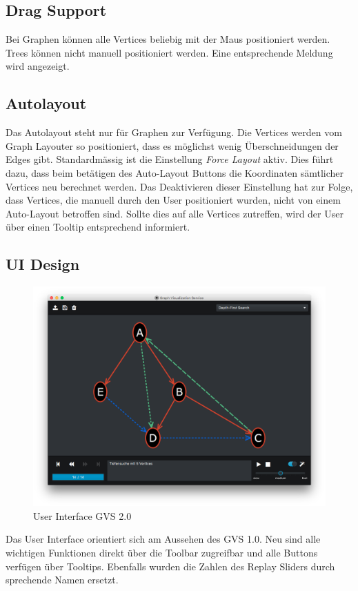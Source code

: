 \documentclass[11pt,a4paper,english,oneside]{book}
\numberwithin{equation}{chapter}
\begin{document}
	\subsection{Drag Support}
	Bei Graphen können alle Vertices beliebig mit der Maus positioniert werden. Trees können nicht manuell positioniert werden. Eine entsprechende Meldung wird angezeigt.
		
	\subsection{Autolayout}
	Das Autolayout steht nur für Graphen zur Verfügung. Die Vertices werden vom Graph Layouter so positioniert, dass es möglichst wenig Überschneidungen der Edges gibt. Standardmässig ist die Einstellung \textit{Force Layout} aktiv. Dies führt dazu, dass beim betätigen des Auto-Layout Buttons die Koordinaten sämtlicher Vertices neu berechnet werden. Das Deaktivieren dieser Einstellung hat zur Folge, dass Vertices, die manuell durch den User positioniert wurden, nicht von einem Auto-Layout betroffen sind. Sollte dies auf alle Vertices zutreffen, wird der User über einen Tooltip entsprechend informiert.
		
	\subsection{UI Design}
	\begin{figure}[h!]
		\centering
		\includegraphics[width=0.7\linewidth]{assets/images/gvs-ui-graph}
		\caption{User Interface GVS 2.0}
		\label{fig:gvs-ui-graph}
	\end{figure}

	Das User Interface orientiert sich am Aussehen des GVS 1.0. Neu sind alle wichtigen Funktionen direkt über die Toolbar zugreifbar und alle Buttons verfügen über Tooltips. Ebenfalls wurden die Zahlen des Replay Sliders durch sprechende Namen ersetzt.
	
\end{document}
